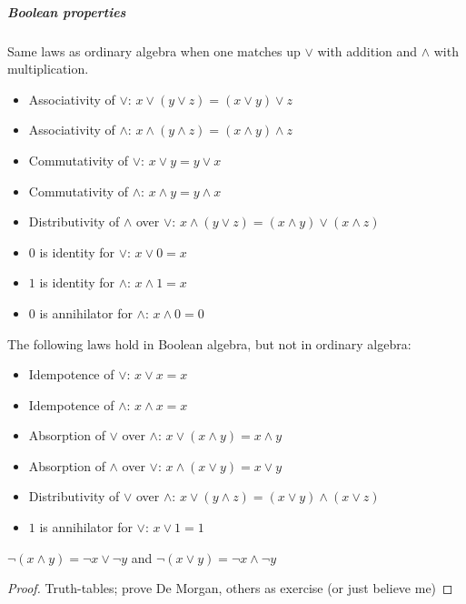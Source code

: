 \subparagraph{Boolean properties}
\begin{property}
    Same laws as ordinary algebra when one matches up $\lor$ with addition and $\land$ with multiplication.
    \begin{itemize}
        \item Associativity of $\lor$: $x \lor (y \lor z) = (x \lor y) \lor z$
        \item Associativity of $\land$: $x \land (y \land z) = (x \land y) \land z$
        \item Commutativity of $\lor$: $x \lor y  = y \lor x$
        \item Commutativity of $\land$: $x \land y  = y \land x$
        \item Distributivity of $\land$ over $\lor$:  $x \land (y \lor z) = (x \land y) \lor (x \land z)$
        \item $0$ is identity for $\lor$: $x \lor 0  = x$
        \item $1$ is identity for $\land$: $x \land 1  = x$
        \item $0$ is annihilator for $\land$: $x \land 0  = 0$
    \end{itemize}
\end{property}
\begin{property}
    The following laws hold in Boolean algebra, but not in ordinary algebra: 
    \begin{itemize}
        \item Idempotence of $\lor$: $x \lor x = x$
        \item Idempotence of $\land$: $x \land x = x$
        \item Absorption of $\lor$ over $\land$: $x \lor (x \land y)  = x \land y$
        \item Absorption of $\land$ over $\lor$: $x \land (x \lor y)  = x \lor y$
        \item Distributivity of $\lor$ over $\land$:  $x \lor (y \land z) = (x \lor y) \land (x \lor z)$
        \item $1$ is annihilator for $\lor$: $x \lor 1 = 1$
    \end{itemize}
\end{property}
\begin{property}
    $\lnot (x \land y) = \lnot x \lor \lnot y$
    and
    $\lnot (x \lor y) = \lnot x \land \lnot y$
\end{property}
\begin{proof}
    Truth-tables; prove De Morgan, others as exercise (or just believe me)
\end{proof}

